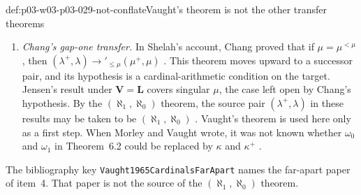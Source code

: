 \begin{hbwarning}{def:p03-w03-p03-029-not-conflate}{Vaught's theorem is not the other transfer theorems}
\begin{enumerate}
        \(\lambda'>\mu'\), larger pairs included. The indiscernible method
        of \cref{thm:p03-em-models} belongs to this theorem, not to the
        \((\aleph_1,\aleph_0)\) theorem.
         shows that the far-apart
        hypothesis cannot be replaced by a single gap: a gap of one
        exponential does not transfer to larger universes over the same
        predicate.
  \item \emph{Chang's gap-one transfer.} In Shelah's account, Chang proved
        that if \(\mu=\mu^{<\mu}\), then
        \((\lambda^+,\lambda)\to'_{\leq\mu}(\mu^+,\mu)\)
        \cite[p.~4, item~(H)]{Shelah2004PairAlephN}. This theorem moves
        upward to a successor pair, and its hypothesis is a
        cardinal-arithmetic condition on the target. Jensen's result under
        \(\mathbf V=\mathbf L\) covers singular \(\mu\), the case left
        open by Chang's hypothesis. By the
        \((\aleph_1,\aleph_0)\) theorem, the source pair \((\lambda^+,\lambda)\)
        in these results may be taken to be \((\aleph_1,\aleph_0)\)
        \cite[p.~5, item~(I) and the remark after (J)]{Shelah2004PairAlephN}.
        Vaught's theorem is used here only as a first step. When
        Morley and Vaught wrote, it was not known whether \(\omega_0\) and
        \(\omega_1\) in Theorem~6.2 could be replaced by \(\kappa\) and
        \(\kappa^+\) \cite[p.~56]{MorleyVaught1962}.
\end{enumerate}
The bibliography key \texttt{Vaught1965CardinalsFarApart} names the
far-apart paper of item~4. That paper is not the source of the
\((\aleph_1,\aleph_0)\) theorem.
\end{hbwarning}

